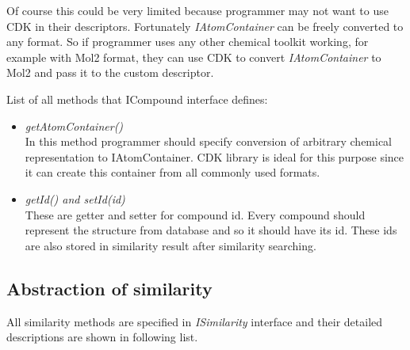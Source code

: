\documentclass[thesis=M,english]{FITthesis}[2012/10/20]
\begin{document}
Of course this could be very limited because programmer may not want to use CDK in their descriptors. Fortunately \textit{IAtomContainer} can be freely converted to any format. So if programmer uses any other chemical toolkit working, for example with Mol2 format, they can use CDK to convert \textit{IAtomContainer} to Mol2 and pass it to the custom descriptor.

List of all methods that ICompound interface defines:

\begin{itemize}
\item \textit{getAtomContainer()} \\ In this method programmer should specify conversion of arbitrary chemical representation to IAtomContainer. CDK library is ideal for this purpose since it can create this container from all commonly used formats.
\item \textit{getId() and setId(id)}  \\ These are getter and setter for compound id. Every compound should represent the structure from database and so it should have its id. These ids are also stored in similarity result after similarity searching.
\end{itemize}


\subsection{Abstraction of similarity}
All similarity methods are specified in \textit{ISimilarity} interface and their detailed descriptions are shown in following list. 
\end{document}
